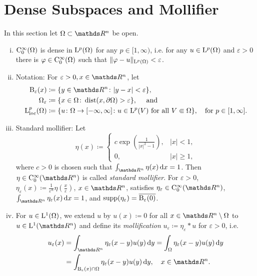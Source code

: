 \section{Dense Subspaces and Mollifier}
\label{sec:mollifier}

In this section let $\Omega \subset \R^n$ be open.
\begin{enumerate}[i)]
  \item $\mathrm{C}_0^\infty(\Omega)$ is dense in $\mathrm{L}^p(\Omega)$ for any $p \in [1,\infty)$, i.e. for any $u \in \mathrm{L}^p(\Omega)$ and $\varepsilon > 0$ there is $\varphi \in \mathrm{C}_0^\infty(\Omega)$ such that $\|\varphi - u\|_{\mathrm{L}^p(\Omega)} < \varepsilon$.
    \item Notation: For $\varepsilon > 0, x \in \R^n$, let 
      \begin{align*}
        \BB_\varepsilon(x) &\coloneqq \{ y \in \R^n \colon |y - x| < \varepsilon \}, \\
        \Omega_\varepsilon &\coloneqq \{ x \in \Omega \colon \dist(x, \partial\Omega) > \varepsilon \}, \quad\text{ and } \\
        \Ell_{\loc}^p(\Omega) &\coloneqq \{ u \colon \Omega \to [-\infty, \infty] \colon u \in \Ell^p(V) \text{ for all } V \Subset \Omega \}, \quad\text{for $p \in [1,\infty]$.}
    \end{align*}
  \item Standard mollifier: Let
    $$
    \eta(x) \coloneqq \begin{cases} c \exp\left( \frac{1}{|x|^2 - 1} \right), &|x| < 1, \\ 0, &|x| \geq 1, \end{cases}
    $$
    where $c > 0$ is chosen such that $\int_{\R^n} \eta(x) \d x = 1$.
    Then $\eta \in \CC_0^\infty(\R^n)$ is called \emph{standard mollifier}.
    For $\varepsilon > 0$,
    $ \eta_\varepsilon(x) \coloneqq \frac{1}{\varepsilon^n} \eta \left(\frac{x}{\varepsilon} \right)$, $x \in \R^n$,
    satisfies $\eta_\varepsilon \in \CC_0^\infty(\R^n)$, $\int_{\R^n} \eta_\varepsilon(x) \d x = 1$, and $\operatorname{supp}(\eta_\varepsilon) = \overline{\mathrm{B}_\varepsilon(0)}$.
  \item For $u \in \mathrm{L}^1(\Omega)$, we extend $u$ by $u(x) \coloneqq 0$ for all $x \in \R^n \setminus \Omega$ to $u \in \Ell^1(\R^n)$ and define its \emph{mollification} $u_\varepsilon \coloneqq \eta_\varepsilon \ast u$ for $\varepsilon > 0$, i.e.
  \begin{align*}
    u_\varepsilon(x) 
    &= \int_{\R^n} \eta_\varepsilon(x - y) u(y) \d y
    = \int_{\Omega} \eta_\varepsilon(x - y) u(y) \d y \\
    &= \int_{\BB_\varepsilon(x) \cap \Omega} \eta_\varepsilon(x - y) u(y) \d y, \quad x \in \R^n.
  \end{align*}
\end{enumerate}
